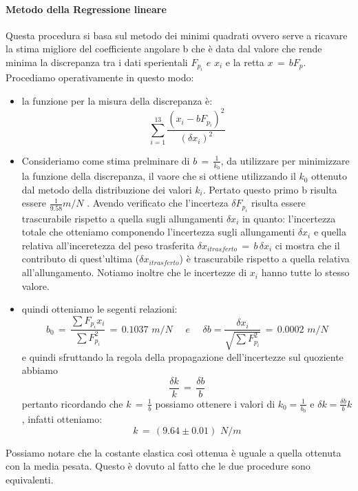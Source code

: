 \paragraph{Metodo della Regressione lineare\\}
Questa procedura si basa sul metodo dei minimi quadrati ovvero serve a ricavare la stima migliore del coefficiente angolare b che è data dal valore che rende minima la discrepanza tra i dati sperientali $F_{p_i} \,\,e\,\, x_i$ e la retta $x \,=\, bF_p$.\\
Procediamo operativamente in questo modo:
\begin{itemize}
	\item{la funzione per la misura della discrepanza è:
			\begin{equation*}
				\sum_{i=1}^{13} \frac{(x_i - bF_{p_i})^2}{(\delta x_i)^2}	
			\end{equation*}}
	\item{Consideriamo come stima prelminare di $b \,=\, \frac{1}{k_0}$, da utilizzare per minimizzare la funzione della discrepanza, il vaore che si ottiene utilizzando il $k_0$ ottenuto dal metodo della distribuzione dei valori $k_i$. Pertato questo primo b risulta essere $\frac{1}{9.58} m/N$ . Avendo verificato che l'incerteza $\delta F_{p_i}$ risulta essere trascurabile rispetto a quella sugli allungamenti $\delta x_i$ in quanto: l'incertezza totale che otteniamo componendo l'incertezza sugli allungamenti $\delta x_i$ e quella relativa all'inceretezza del peso trasferita $\delta x_{i trasferto} \,=\, b \, \delta x_i $ ci mostra che il contributo di quest'ultima ($\delta x_{i trasferto}$) è trascurabile rispetto a quella relativa all'allungamento. Notiamo inoltre che le incertezze di $x_i$ hanno tutte lo stesso valore.}
	\item{quindi otteniamo le segenti relazioni:
			\begin{equation*}
				b_0  \,=\,  \frac{\sum F_{p_i}  x_i}{\sum F_{p_i}^2} \,=\, 0.1037 \,\, m/N \quad \,\, e \quad\,\,
				\delta b  =  \frac{\delta x_i}{\sqrt{\sum F_{p_i}^2}} \,=\, 0.0002 \,\, m/N
			\end{equation*}
			e quindi sfruttando la regola della propagazione dell'incertezze sul quoziente abbiamo
			\begin{equation*}
				\frac{\delta k}{k} \,=\, \frac{\delta b}{b}
			\end{equation*}
			pertanto ricordando che $k \,=\, \frac{1}{b}$ possiamo ottenere i valori di $k_0 = \frac{1}{b_0}$ e $\delta k = \frac{\delta b}{b} k$, infatti otteniamo:
			\begin{equation*}
				k \,=\, (9.64 \pm 0.01) \,\,N/m
			\end{equation*}
			}
\end{itemize}
Possiamo notare che la costante elastica così ottenua è uguale a quella ottenuta con la media pesata. Questo è dovuto al fatto che le due procedure sono equivalenti.

